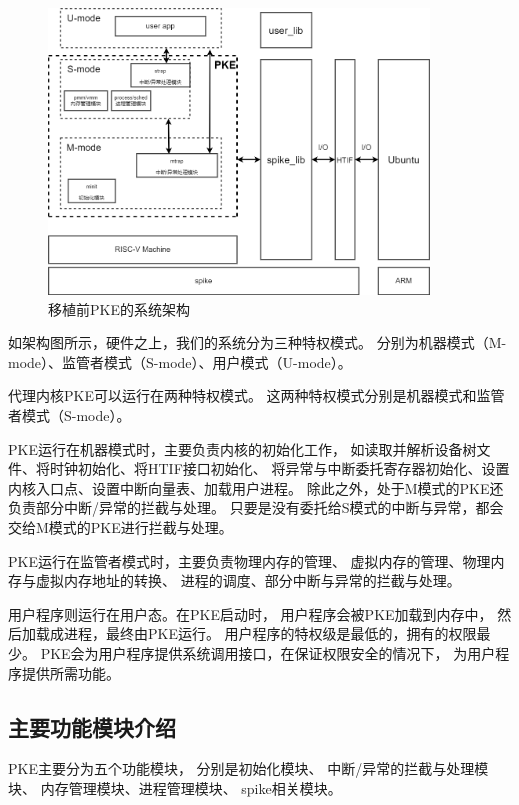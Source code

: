 \begin{figure}[htbp]
    \vspace{13pt} %
    \centering
    \includegraphics[width=0.9\textwidth]{images/before_sys_struct.drawio.png}
    \caption{移植前PKE的系统架构}\label{移植前PKE的系统架构} %
\end{figure}

如架构图所示，硬件之上，我们的系统分为三种特权模式。
分别为机器模式（M-mode）、监管者模式（S-mode）、用户模式（U-mode）。

代理内核PKE可以运行在两种特权模式。
这两种特权模式分别是机器模式和监管者模式（S-mode）。

PKE运行在机器模式时，主要负责内核的初始化工作，
如读取并解析设备树文件、将时钟初始化、将HTIF接口初始化、
将异常与中断委托寄存器初始化、设置内核入口点、设置中断向量表、加载用户进程。
除此之外，处于M模式的PKE还负责部分中断/异常的拦截与处理。
只要是没有委托给S模式的中断与异常，都会交给M模式的PKE进行拦截与处理。

PKE运行在监管者模式时，主要负责物理内存的管理、
虚拟内存的管理、物理内存与虚拟内存地址的转换、
进程的调度、部分中断与异常的拦截与处理。

用户程序则运行在用户态。在PKE启动时，
用户程序会被PKE加载到内存中，
然后加载成进程，最终由PKE运行。
用户程序的特权级是最低的，拥有的权限最少。
PKE会为用户程序提供系统调用接口，在保证权限安全的情况下，
为用户程序提供所需功能。

\subsection{主要功能模块介绍}

PKE主要分为五个功能模块，
分别是初始化模块、
中断/异常的拦截与处理模块、
内存管理模块、进程管理模块、
spike相关模块。

